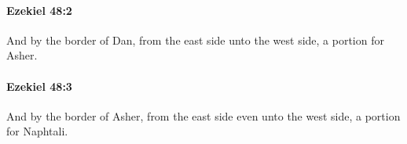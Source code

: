		\paragraph{Ezekiel 48:2} %
			\label{EZEKIEL-48-2}

			And by the border of Dan, from the east side unto the west side, a portion for Asher.


		\paragraph{Ezekiel 48:3} %
			\label{EZEKIEL-48-3}

			And by the border of Asher, from the east side even unto the west side, a portion for Naphtali.


